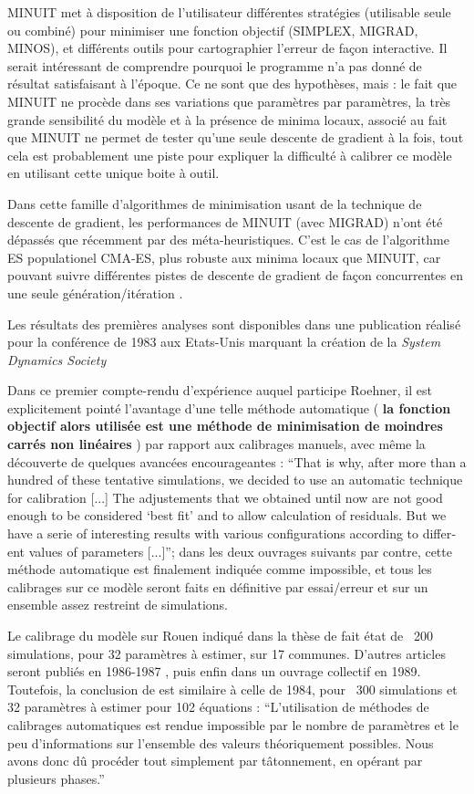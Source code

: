MINUIT met à disposition de l’utilisateur différentes stratégies (utilisable seule ou combiné) pour minimiser une fonction objectif (SIMPLEX, MIGRAD, MINOS), et différents outils pour cartographier l’erreur de façon interactive.  Il serait intéressant de comprendre pourquoi le programme n’a pas donné de résultat satisfaisant à l’époque. Ce ne sont que des hypothèses, mais : le fait que MINUIT ne procède dans ses variations que paramètres par paramètres, la très grande sensibilité du modèle et à la présence de minima locaux, associé au fait que MINUIT ne permet de tester qu’une seule descente de gradient à la fois, tout cela est probablement une piste pour expliquer la difficulté à calibrer ce modèle en utilisant cette unique boite à outil.

Dans cette famille d’algorithmes de minimisation usant de la technique de descente de gradient, les performances de MINUIT (avec MIGRAD) n’ont été dépassés que récemment par des méta-heuristiques. C’est le cas de l’algorithme ES populationel CMA-ES, plus robuste aux minima locaux que MINUIT, car pouvant suivre différentes pistes de descente de gradient de façon concurrentes en une seule génération/itération \autocite{Berlich2003}. 

Les résultats des premières analyses sont disponibles dans une publication \autocite{Pumain1983} réalisé pour la conférence de 1983 aux Etats-Unis marquant la création \autocite{Andersen2007} de la \textit{System Dynamics Society}

Dans ce premier compte-rendu d'expérience auquel participe Roehner, il est explicitement pointé l’avantage d’une telle méthode automatique ( \textbf{la fonction objectif alors utilisée est une méthode de minimisation de moindres carrés non linéaires }) par rapport aux calibrages manuels, avec même la découverte de quelques avancées encourageantes : \foreignquote{english}{That is why, after more than a hundred of these tentative simulations, we decided to use an automatic technique for calibration [...] The adjustements that we obtained until now are not good enough to be considered \enquote{best fit} and to allow calculation of residuals. But we have a serie of interesting results with various configurations according to different values of parameters [...]}; dans les deux ouvrages suivants par contre, cette méthode automatique est finalement indiquée comme impossible, et tous les calibrages sur ce modèle seront faits en définitive par essai/erreur et sur un ensemble assez restreint de simulations.

Le calibrage du modèle sur Rouen indiqué dans la thèse de \autocites[348,354]{Sanders1984}{Sanders1985} fait état de ~200 simulations, pour 32 paramètres à estimer, sur 17 communes. D'autres articles seront publiés en 1986-1987 \autocites{Pumain1986,Pumain1987}, puis enfin dans un ouvrage collectif en 1989. Toutefois, la conclusion de \textcite[112]{Pumain1989} est similaire à celle de 1984, pour ~300 simulations et 32 paramètres à estimer pour 102 équations : \enquote{L’utilisation de méthodes de calibrages automatiques est rendue impossible par le nombre de paramètres et le peu d’informations sur l’ensemble des valeurs théoriquement possibles. Nous avons donc dû procéder tout simplement par tâtonnement, en opérant par plusieurs phases.}

